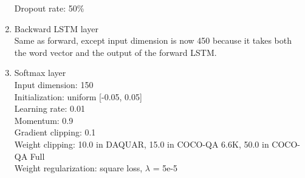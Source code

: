 \begin{enumerate}
Dropout rate: 50\%
\item Backward LSTM layer\\
Same as forward, except input dimension is now 450 because it takes both the word vector and the output of the forward LSTM.
\item Softmax layer\\
Input dimension: 150\\
Initialization: uniform [-0.05, 0.05]\\
Learning rate: 0.01\\
Momentum: 0.9\\
Gradient clipping: 0.1\\
Weight clipping: 10.0 in DAQUAR, 15.0 in COCO-QA 6.6K, 50.0 in COCO-QA Full\\
Weight regularization: square loss, $\lambda$ = 5e-5
\end{enumerate}